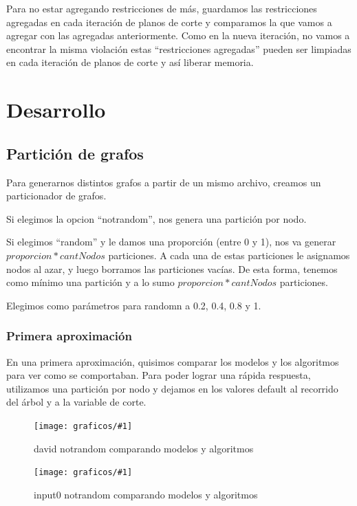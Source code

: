 \documentclass[a4paper, 10pt, twoside]{article}
\newcommand{\diagramavfigChico}[2]{%
  \begin{figure}[H]
    \texttt{[image: graficos/\#1]}%
    \caption{#2}
    \label{fig:#1}
  \end{figure}
}
\begin{document}
Para no estar agregando restricciones de más, guardamos las restricciones agregadas en cada iteración de planos de corte y comparamos la que vamos a agregar con las agregadas anteriormente. Como en la nueva iteración, no vamos a encontrar la misma violación estas ``restricciones agregadas'' pueden ser limpiadas en cada iteración de planos de corte y así liberar memoria.

\section{Desarrollo}

\subsection{Partición de grafos}

Para generarnos distintos grafos a partir de un mismo archivo, creamos un particionador de grafos.

Si elegimos la opcion ``notrandom'', nos genera una partición por nodo.

Si elegimos ``random'' y le damos una proporción (entre 0 y 1), nos va generar $proporcion * cantNodos$ particiones. A cada una de estas particiones le asignamos nodos al azar, y luego borramos las particiones vacías. De esta forma, tenemos como mínimo una partición y a lo sumo $proporcion * cantNodos$ particiones.

Elegimos como parámetros para randomn a 0.2, 0.4, 0.8 y 1.

\subsubsection{Primera aproximación}

En una primera aproximación, quisimos comparar los modelos y los algoritmos para ver como se comportaban. Para poder lograr una rápida respuesta, utilizamos una partición por nodo y dejamos en los valores default al recorrido del árbol y a la variable de corte.

  \begin{minipage}{\linewidth}
      \centering
      \begin{minipage}{0.49\linewidth}
	      \diagramavfigChico{david_notrandom_cbvsbb}{david notrandom comparando modelos y algoritmos}
      \end{minipage}
      \begin{minipage}{0.49\linewidth}
          \diagramavfigChico{input0_notrandom_cbvsbb}{input0 notrandom comparando modelos y algoritmos}
      \end{minipage}
  \end{minipage}
\end{document}
